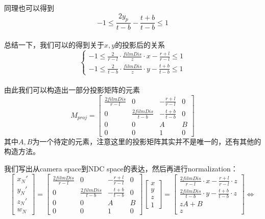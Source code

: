 同理也可以得到
\begin{displaymath}
-1 \leq \frac{2y_p}{t - b} - \frac{t + b}{t - b} \leq 1
\end{displaymath}
\\

总结一下，我们可以的得到关于$x, y$的投影后的关系
\begin{displaymath}
\left\{
\begin{gathered}
-1 \leq \frac{2}{r - l}\cdot\frac{filmDis}{z}\cdot x - \frac{r + l}{r - l} \leq 1\\
-1 \leq \frac{2}{t - b}\cdot\frac{filmDis}{z}\cdot y - \frac{t + b}{t - b} \leq 1
\end{gathered}
\right.
\end{displaymath}
\\

由此我们可以构造出一部分投影矩阵的元素
\begin{displaymath}
M_{proj} = 
\begin{bmatrix}
\frac{2filmDis}{r - l} & 0  & -\frac{r + l}{r - l} & 0\\
0 & \frac{2filmDis}{t - b} & -\frac{t + b}{t - b} & 0\\
0 & 0 & A & B\\
0 & 0 & 1 & 0
\end{bmatrix}
\end{displaymath}
其中$A, B$为一个待定的元素，注意这里的投影矩阵其实并不是唯一的，还有其他的构造方法。

我们写出从camera space到NDC space的表达，然后再进行normalization：
\begin{displaymath}
\begin{bmatrix}
x_N'\\
y_N'\\
z_N'\\
w_N
\end{bmatrix} = 
\begin{bmatrix}
\frac{2filmDis}{r - l} & 0 & -\frac{r + l}{r - l} & 0\\
0 & \frac{2filmDis}{t - b} & -\frac{t + b}{t - b} & 0\\
0 & 0 & A & B\\
0 & 0 & 1 & 0
\end{bmatrix}
\begin{bmatrix}
x\\
y\\
z\\
1
\end{bmatrix} =
\left[\begin{gathered}
\frac{2filmDis}{r - l}\cdot x - \frac{r + l}{r - l} \cdot z\\
\frac{2filmDis}{t - b} \cdot y - \frac{t + b}{t - b}\cdot z\\
zA + B\\
z
\end{gathered}\right]\Leftrightarrow
\end{displaymath}

